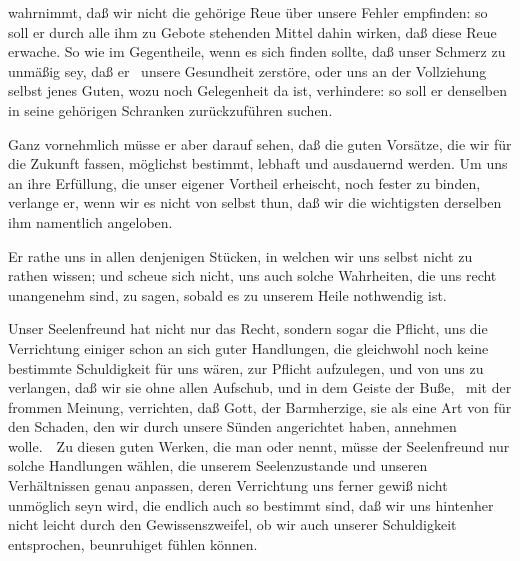 \begin{aufza}
\begin{aufzb}
\item wahrnimmt, daß wir nicht die gehörige Reue über unsere Fehler empfinden: so soll er durch alle ihm zu Gebote stehenden Mittel dahin wirken, daß diese Reue erwache. So wie im Gegentheile, wenn es sich finden sollte, daß unser Schmerz zu unmäßig sey, daß er \zB\  unsere Gesundheit zerstöre, oder uns an der Vollziehung selbst jenes Guten, wozu noch Gelegenheit da ist, verhindere: so soll er denselben in seine gehörigen Schranken zurückzuführen suchen.
\item Ganz vornehmlich müsse er aber darauf sehen, daß die guten Vorsätze, die wir für die Zukunft fassen, möglichst bestimmt, lebhaft und ausdauernd werden. Um uns an ihre Erfüllung, die unser eigener Vortheil erheischt, noch fester zu binden, verlange er, wenn wir es nicht von selbst thun, daß wir die wichtigsten derselben ihm namentlich angeloben.
\item Er rathe uns in allen denjenigen Stücken, in welchen wir uns selbst nicht zu rathen wissen; und scheue sich nicht, uns auch solche Wahrheiten, die uns recht unangenehm sind, zu sagen, sobald es zu unserem Heile nothwendig ist.
\item Unser Seelenfreund hat nicht nur das Recht, sondern sogar die Pflicht, uns die Verrichtung einiger schon an sich guter Handlungen, die gleichwohl noch keine bestimmte Schuldigkeit für uns wären, zur Pflicht aufzulegen, und von uns zu verlangen, daß wir sie ohne allen Aufschub, und in dem Geiste der Buße, \dh\  mit der frommen Meinung, verrichten, daß Gott, der Barmherzige, sie als eine Art von  für den Schaden, den wir durch unsere Sünden angerichtet haben, annehmen wolle.~\ Zu diesen guten Werken, die man  oder  nennt, müsse der Seelenfreund nur solche Handlungen wählen, die unserem Seelenzustande und unseren Verhältnissen genau anpassen, deren Verrichtung uns ferner gewiß nicht unmöglich seyn wird, die endlich auch so bestimmt sind, daß wir uns hintenher nicht leicht durch den Gewissenszweifel, ob wir auch unserer Schuldigkeit entsprochen, beunruhiget fühlen können.
\end{aufzb}

\end{aufza}
